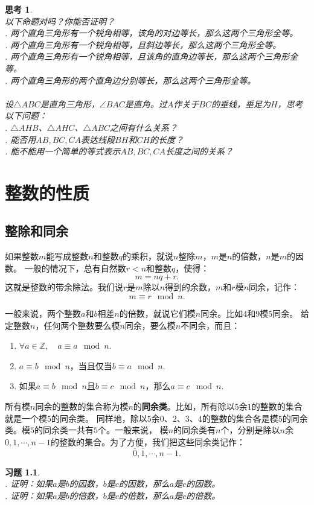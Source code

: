 \documentclass[12pt,UTF8]{ctexbook}
\newtheorem{sk}{思考}[section]
\newtheorem{xt}{习题}[section]
\begin{document}
\begin{sk}\label{sk:4-1-0}
    \mbox{}\\
    以下命题对吗？你能否证明？\\
    . 两个直角三角形有一个锐角相等，该角的对边等长，那么这两个三角形全等。\\
    . 两个直角三角形有一个锐角相等，且斜边等长，那么这两个三角形全等。\\
    . 两个直角三角形有一个锐角相等，且该角的直角边等长，那么这两个三角形全等。\\
    . 两个直角三角形的两个直角边分别等长，那么这两个三角形全等。\\
    \vspace{2pt}\\
    设$\triangle ABC$是直角三角形，$\angle BAC$是直角。过$A$作关于$BC$的垂线，垂足为$H$，思考以下问题：\\
    . $\triangle AHB$、$\triangle AHC$、$\triangle ABC$之间有什么关系？\\
    . 能否用$AB, BC, CA$表达线段$BH$和$CH$的长度？\\
    . 能不能用一个简单的等式表示$AB, BC, CA$长度之间的关系？
\end{sk}


\chapter{整数的性质}

\section{整除和同余}
如果整数$m$能写成整数$n$和整数$q$的乘积，就说$n$整除$m$，$m$是$n$的倍数，$n$是$m$的因数。
一般的情况下，总有自然数$r < n$和整数$q$，使得：
$$ m = nq + r.$$
这就是整数的带余除法。我们说$r$是$m$除以$n$得到的余数，$m$和$r$模$n$同余，记作：
$$ m \equiv r \mod n.$$

一般来说，两个整数$a$和$b$相差$n$的倍数，就说它们模$n$同余。比如$4$和$9$模$5$同余。
给定整数$n$，任何两个整数要么模$n$同余，要么模$n$不同余，而且：
\begin{enumerate}
    \item $\forall a \in \mathbb{Z}, \quad a \equiv a \mod n.$
    \item $a \equiv b \mod n$，当且仅当$b \equiv a \mod n.$
    \item 如果$a \equiv b \mod n$且$b \equiv c \mod n$，那么$a \equiv c \mod n.$
\end{enumerate}
所有模$n$同余的整数的集合称为模$n$的\textbf{同余类}。比如，所有除以$5$余$1$的整数的集合就是一个模$5$的同余类。
同样地，除以$5$余$0$、$2$、$3$、$4$的整数的集合各是模$5$的同余类。模$5$的同余类一共有$5$个。一般来说，
模$n$的同余类有$n$个，分别是除以$n$余$0,1,\cdots,n-1$的整数的集合。为了方便，我们把这些同余类记作：
$$ \overline{0}, \overline{1}, \cdots , \overline{n-1}.$$
\begin{xt}\label{xt:5-0-0}
    \mbox{}\\
    . 证明：如果$a$是$b$的因数，$b$是$c$的因数，那么$a$是$c$的因数。\\
    . 证明：如果$a$是$b$的倍数，$b$是$c$的倍数，那么$a$是$c$的倍数。
\end{xt}
\end{document}
